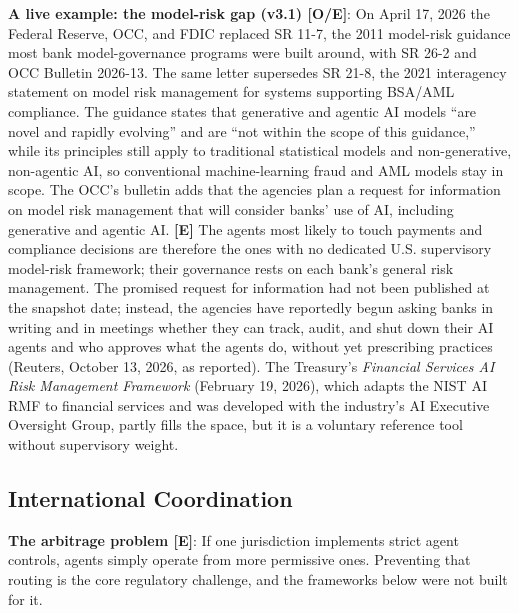 \documentclass[11pt,letterpaper]{article}
\begin{document}
\textbf{A live example: the model-risk gap (v3.1) [O/E]}: On April 17, 2026 the Federal Reserve, OCC, and FDIC replaced SR 11-7, the 2011 model-risk guidance most bank model-governance programs were built around, with SR 26-2 and OCC Bulletin 2026-13. The same letter supersedes SR 21-8, the 2021 interagency statement on model risk management for systems supporting BSA/AML compliance. The guidance states that generative and agentic AI models ``are novel and rapidly evolving'' and are ``not within the scope of this guidance,'' while its principles still apply to traditional statistical models and non-generative, non-agentic AI, so conventional machine-learning fraud and AML models stay in scope. The OCC's bulletin adds that the agencies plan a request for information on model risk management that will consider banks' use of AI, including generative and agentic AI. \textbf{[E]} The agents most likely to touch payments and compliance decisions are therefore the ones with no dedicated U.S. supervisory model-risk framework; their governance rests on each bank's general risk management. The promised request for information had not been published at the snapshot date; instead, the agencies have reportedly begun asking banks in writing and in meetings whether they can track, audit, and shut down their AI agents and who approves what the agents do, without yet prescribing practices (Reuters, October 13, 2026, as reported). The Treasury's \textit{Financial Services AI Risk Management Framework} (February 19, 2026), which adapts the NIST AI RMF to financial services and was developed with the industry's AI Executive Oversight Group, partly fills the space, but it is a voluntary reference tool without supervisory weight.

\subsection{International Coordination}
\label{sec:intl}

\textbf{The arbitrage problem [E]}: If one jurisdiction implements strict agent controls, agents simply operate from more permissive ones. Preventing that routing is the core regulatory challenge, and the frameworks below were not built for it.
\end{document}
